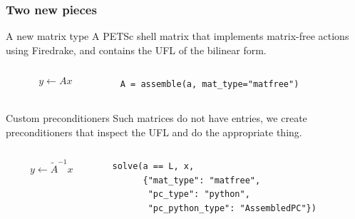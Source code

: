 \documentclass[presentation,aspectratio=43]{beamer}
\begin{document}
\begin{frame}[fragile,t]
  \frametitle{Two new pieces}
  \begin{block}{A new matrix type}
    A PETSc shell matrix that implements matrix-free actions using
    Firedrake, and contains the UFL of the bilinear form.
    \begin{columns}
      \begin{column}{0.5\textwidth}
      \begin{equation*}
        y \leftarrow A x
      \end{equation*}
    \end{column}
    \hspace{-0.1\textwidth}
    \begin{column}{0.7\textwidth}
\begin{verbatim}
A = assemble(a, mat_type="matfree")
\end{verbatim}
    \end{column}
    \end{columns}
  \end{block}
  \vspace{1.5\baselineskip}
  \begin{block}{Custom preconditioners}
    Such matrices do not have entries, we create preconditioners
    that inspect the UFL and do the appropriate thing.
    \begin{columns}
      \begin{column}{0.5\textwidth}
    \begin{equation*}
      y \leftarrow \tilde{A}^{-1} x
    \end{equation*}
  \end{column}
  \hspace{-0.1\textwidth}
  \begin{column}{0.7\textwidth}
\begin{verbatim}
solve(a == L, x,
      {"mat_type": "matfree",
       "pc_type": "python",
       "pc_python_type": "AssembledPC"})
\end{verbatim}
  \end{column}
  \end{columns}
  \end{block}
\end{frame}
\end{document}
